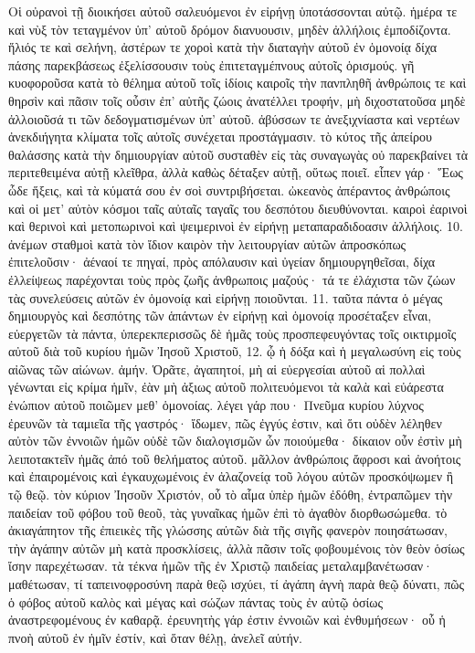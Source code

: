 Οἱ οὐρανοὶ τῇ διοικήσει αὐτοῦ σαλευόμενοι ἐν εἰρήνῃ ὑποτάσσονται αὐτῷ. ἡμέρα τε καὶ νὺξ τὸν τεταγμένον ὑπ’ αὐτοῦ δρόμον διανυουσιν, μηδὲν ἀλλήλοις ἐμποδίζοντα. ἥλιός τε καὶ σελήνη, ἀστέρων τε χοροὶ κατὰ τὴν διαταγὴν αὐτοῦ ἐν ὁμονοίᾳ δίχα πάσης παρεκβάσεως ἐξελίσσουσιν τοὺς ἐπιτεταγμέπνους αὐτοῖς ὁρισμούς. γῆ κυοφοροῦσα κατὰ τὸ θέλημα αὐτοῦ τοῖς ἰδίοις καιροῖς τὴν πανπληθῆ ἀνθρώποις τε καὶ θηρσὶν καὶ πᾶσιν τοῖς οὖσιν ἐπ’ αὐτῆς ζώοις ἀνατέλλει τροφήν, μὴ διχοστατοῦσα μηδὲ ἀλλοιοῦσά τι τῶν δεδογματισμένων ὑπ’ αὐτοῦ. ἀβύσσων τε ἀνεξιχνίαστα καὶ νερτέων ἀνεκδιήγητα κλίματα τοῖς αὐτοῖς συνέχεται προστάγμασιν. τὸ κύτος τῆς ἀπείρου θαλάσσης κατὰ τὴν δημιουργίαν αὐτοῦ συσταθὲν εἰς τὰς συναγωγὰς οὐ παρεκβαίνει τὰ περιτεθειμένα αὐτῇ κλεῖθρα, ἀλλὰ καθὼς δέταξεν αὐτῇ, οὕτως ποιεῖ. εἶπεν γάρ· Ἕως ὧδε ἥξεις, καὶ τὰ κύματά σου ἐν σοὶ συντριβήσεται. ὠκεανὸς ἀπέραντος ἀνθρώποις καὶ οἱ μετ’ αὐτὸν κόσμοι ταῖς αὐταῖς ταγαῖς του δεσπότου διευθύνονται. καιροὶ ἐαρινοὶ καὶ θερινοὶ καὶ μετοπωρινοὶ καὶ ψειμερινοὶ ἐν εἰρήνῃ μεταπαραδιδοασιν ἀλλήλοις. 10. ἀνέμων σταθμοὶ κατὰ τὸν ἴδιον καιρὸν τὴν λειτουργίαν αὐτῶν ἀπροσκόπως ἐπιτελοῦσιν· ἀέναοί τε πηγαί, πρὸς απόλαυσιν καὶ ὐγείαν δημιουργηθεῖσαι, δίχα ἐλλείψεως παρέχονται τοὺς πρὸς ζωῆς ἀνθρωποις μαζούς· τά τε ἐλάχιστα τῶν ζώων τὰς συνελεύσεις αὐτῶν ἐν ὁμονοίᾳ καὶ εἰρήνῃ ποιοῦνται. 11. ταῦτα πάντα ὁ μέγας δημιουργὸς καὶ δεσπότης τῶν ἁπάντων ἐν εἰρήνῃ καὶ ὁμονοίᾳ προσέταξεν εἶναι, εὐεργετῶν τὰ πάντα, ὑπερεκπερισσῶς δὲ ἡμᾶς τοὺς προσπεφευγόντας τοῖς οικτιρμοῖς αὐτοῦ διὰ τοῦ κυρίου ἡμῶν Ἰησοῦ Χριστοῦ, 12. ᾦ ἡ δόξα καὶ ἡ μεγαλωσύνη εἰς τοὺς αἰῶνας τῶν αἰώνων. ἀμήν.
Ὁρᾶτε, ἀγαπητοί, μὴ αἱ εὐεργεσίαι αὐτοῦ αἱ πολλαὶ γένωνται εἰς κρίμα ἡμῖν, ἐὰν μὴ ἀξιως αὐτοῦ πολιτευόμενοι τὰ καλὰ καὶ εὐάρεστα ἐνώπιον αὐτοῦ ποιῶμεν μεθ’ ὁμονοίας. λέγει γάρ που· Πνεῦμα κυρίου λύχνος ἐρευνῶν τὰ ταμιεῖα τῆς γαστρός· ἴδωμεν, πῶς ἐγγύς ἐστιν, καὶ ὅτι οὐδὲν λέληθεν αὐτὸν τῶν ἐννοιῶν ἡμῶν οὐδὲ τῶν διαλογισμῶν ὧν ποιούμεθα· δίκαιον οὖν ἐστὶν μὴ λειποτακτεῖν ἡμᾶς ἀπό τοῦ θελήματος αὐτοῦ. μᾶλλον ἀνθρώποις ἄφροσι καὶ ἀνοήτοις καὶ ἐπαιρομένοις καὶ ἐγκαυχωμένοις ἐν ἀλαζονείᾳ τοῦ λόγου αὐτῶν προσκόψωμεν ἢ τῷ θεῷ. τὸν κύριον Ἰησοῦν Χριστόν, οὗ τὸ αἷμα ὑπὲρ ἡμῶν ἐδόθη, ἐντραπῶμεν τὴν παιδείαν τοῦ φόβου τοῦ θεοῦ, τὰς γυναῖκας ἡμῶν ἐπὶ τὸ ἀγαθὸν διορθωσώμεθα. τὸ ἀκιαγάπητον τῆς ἐπιεικὲς τῆς γλώσσης αὐτῶν διὰ τῆς σιγῆς φανερὸν ποιησάτωσαν, τὴν ἀγάπην αὐτῶν μὴ κατὰ προσκλίσεις, ἀλλὰ πᾶσιν τοῖς φοβουμένοις τὸν θεὸν ὁσίως ἴσην παρεχέτωσαν. τὰ τέκνα ἡμῶν τῆς ἐν Χριστῷ παιδείας μεταλαμβανέτωσαν· μαθέτωσαν, τί ταπεινοφροσύνη παρὰ θεῷ ισχύει, τί ἀγάπη ἁγνὴ παρὰ θεῷ δύνατι, πῶς ὁ φόβος αὐτοῦ καλὸς καὶ μέγας καὶ σώζων πάντας τοὺς ἐν αὐτῷ ὁσίως ἀναστρεφομένους ἐν καθαρᾷ. ἐρευνητὴς γάρ ἐστιν ἐννοιῶν καὶ ἐνθυμήσεων· οὗ ἡ πνοὴ αὐτοῦ ἐν ἡμῖν ἐστίν, καὶ ὅταν θέλῃ, ἀνελεῖ αὐτήν.
